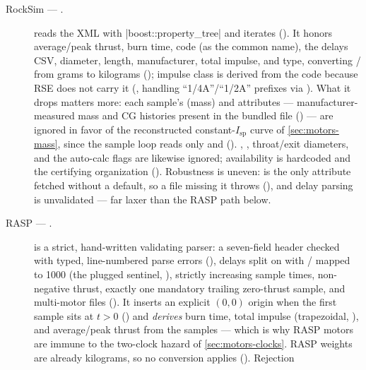 \begin{description}
\item[RockSim  --- \fpartial.]  reads the XML with
  \cppinline|boost::property_tree| and iterates 
  (). It honors average/peak thrust, burn time, code (as the
  common name), the delays CSV, diameter, length, manufacturer, total impulse, and type, converting
  / from grams to kilograms ();
  impulse class is derived from the code because RSE does not carry it
  (, handling ``1/4A''/``1/2A'' prefixes via
  ). What it drops matters more: each  sample's
   (mass) and  attributes --- manufacturer-measured mass and CG histories present
  in the bundled file () --- are ignored in favor of the reconstructed
  constant-$I_{\mathrm{sp}}$ curve of \cref{sec:motors-mass}, since the sample loop reads only
   and  (). , ,
  throat/exit diameters, and the auto-calc flags are likewise ignored; availability is hardcoded
   and the certifying organization 
  (). Robustness is uneven:  is the only attribute
  fetched without a default, so a file missing it throws (),
  and delay parsing is unvalidated  --- far laxer than the RASP path below.
\item[RASP  --- \fpresent.]  is a strict, hand-written validating
  parser: a seven-field header checked with typed, line-numbered parse errors
  (), delays split on \code{-} with / mapped to
  1000 (the plugged sentinel, ), strictly increasing sample times,
  non-negative thrust, exactly one mandatory trailing zero-thrust sample, and multi-motor files
  (). It inserts an explicit $(0,0)$ origin when the first sample
  sits at $t>0$ () and \emph{derives} burn time, total impulse
  (trapezoidal, ), and average/peak thrust from the samples --- which
  is why RASP motors are immune to the two-clock hazard of \cref{sec:motors-clocks}. RASP weights
  are already kilograms, so no conversion applies (). Rejection

\end{description}
